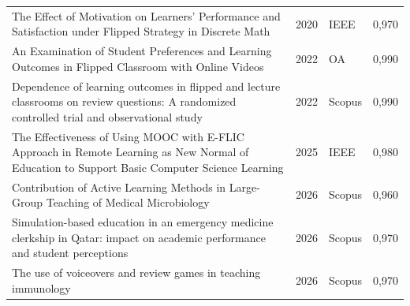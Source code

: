 \begin{longtable}{@{}>{\raggedright\arraybackslash}p{}%
    r>{\raggedright\arraybackslash}p{}r@{}}
  The Effect of Motivation on Learners' Performance and Satisfaction under Flipped Strategy in Discrete Math & 2020 & IEEE & 0,970 \\
  An Examination of Student Preferences and Learning Outcomes in Flipped Classroom with Online Videos & 2022 & OA & 0,990 \\
  Dependence of learning outcomes in flipped and lecture classrooms on review questions: A randomized controlled trial and observational study & 2022 & Scopus & 0,990 \\
  The Effectiveness of Using MOOC with E-FLIC Approach in Remote Learning as New Normal of Education to Support Basic Computer Science Learning & 2025 & IEEE & 0,980 \\
  Contribution of Active Learning Methods in Large-Group Teaching of Medical Microbiology & 2026 & Scopus & 0,960 \\
  Simulation-based education in an emergency medicine clerkship in Qatar: impact on academic performance and student perceptions & 2026 & Scopus & 0,970 \\
  The use of voiceovers and review games in teaching immunology & 2026 & Scopus & 0,970 \\
\end{longtable}
\endgroup

